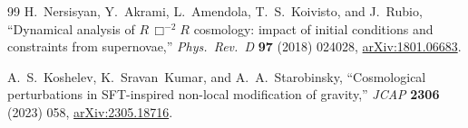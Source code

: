 \documentclass[11pt,a4paper]{article}
\theoremstyle{plain}
\theoremstyle{definition}
\begin{document}
\begin{thebibliography}{99}
H.~Nersisyan, Y.~Akrami, L.~Amendola, T.~S.~Koivisto, and
J.~Rubio,
``Dynamical analysis of $R\,\Box^{-2}R$ cosmology: impact of initial
conditions and constraints from supernovae,''
\emph{Phys.\ Rev.\ D} \textbf{97} (2018) 024028,
\href{https://arxiv.org/abs/1801.06683}{arXiv:1801.06683}.

A.~S.~Koshelev, K.~Sravan~Kumar, and A.~A.~Starobinsky,
``Cosmological perturbations in SFT-inspired non-local modification of
gravity,''
\emph{JCAP} \textbf{2306} (2023) 058,
\href{https://arxiv.org/abs/2305.18716}{arXiv:2305.18716}.

\end{thebibliography}
\end{document}
